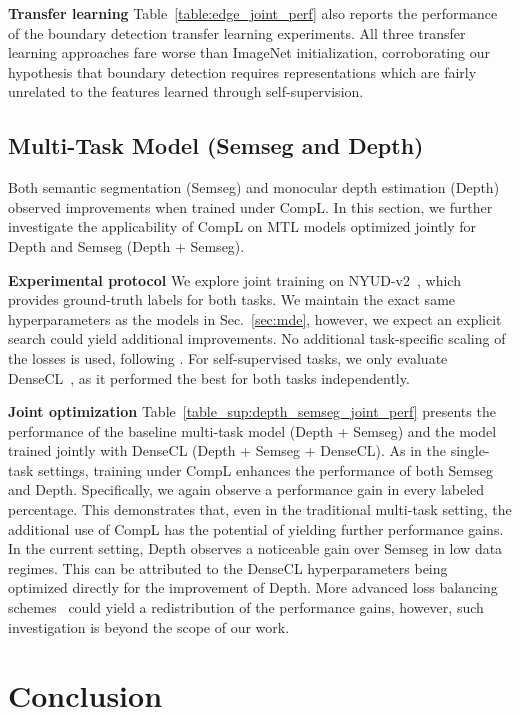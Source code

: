 \documentclass[10pt,twocolumn,letterpaper]{article}
\newcommand{\parsection}[1]{\vspace{1mm}\noindent\textbf{#1 }}
\begin{document}
\parsection{Transfer learning}
Table~\ref{table:edge_joint_perf} also reports the performance of the boundary detection transfer learning experiments. All three transfer learning approaches fare worse than ImageNet initialization, corroborating our hypothesis that boundary detection requires representations which are fairly unrelated to the features learned through self-supervision.



\subsection{Multi-Task Model (Semseg and Depth)}

Both semantic segmentation (Semseg) and monocular depth estimation (Depth) observed improvements when trained under CompL. In this section, we further investigate the applicability of CompL on MTL models optimized jointly for Depth and Semseg (Depth + Semseg).

\parsection{Experimental protocol}
We explore joint training on NYUD-v2~\cite{silberman2012indoor}, which provides ground-truth labels for both tasks. 
We maintain the exact same hyperparameters as the models in Sec.~\ref{sec:mde}, however, we expect an explicit search could yield additional improvements. 
No additional task-specific scaling of the losses is used, following \cite{maninis2019attentive}. 
For self-supervised tasks, we only evaluate DenseCL~\cite{wang2020dense}, as it performed the best for both tasks independently.

\parsection{Joint optimization}
Table~\ref{table_sup:depth_semseg_joint_perf} presents the performance of the baseline multi-task model (Depth + Semseg) and the model trained jointly with DenseCL (Depth + Semseg + DenseCL). 
As in the single-task settings, training under CompL enhances the performance of both Semseg and Depth. 
Specifically, we again observe a performance gain in every labeled percentage. 
This demonstrates that, even in the traditional multi-task setting, the additional use of CompL has the potential of yielding further performance gains. 
In the current setting, Depth observes a noticeable gain over Semseg in low data regimes. 
This can be attributed to the DenseCL hyperparameters being optimized directly for the improvement of Depth.
More advanced loss balancing schemes~\cite{chen2018gradnorm} could yield a redistribution of the performance gains, however, such investigation is beyond the scope of our work.
 
\section{Conclusion}
\end{document}
